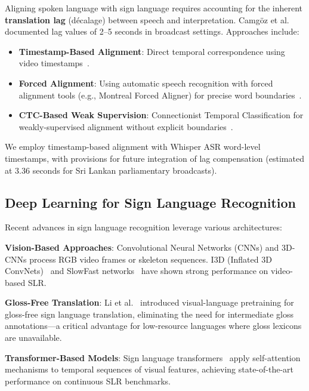 \documentclass[journal]{IEEEtran}
\begin{document}
Aligning spoken language with sign language requires accounting for the inherent \textbf{translation lag} (décalage) between speech and interpretation. Camgöz et al.~\cite{camgoz2018neural} documented lag values of 2--5 seconds in broadcast settings. Approaches include:

\begin{itemize}
    \item \textbf{Timestamp-Based Alignment}: Direct temporal correspondence using video timestamps~\cite{camgoz2018neural}.
    \item \textbf{Forced Alignment}: Using automatic speech recognition with forced alignment tools (e.g., Montreal Forced Aligner) for precise word boundaries~\cite{mcauliffe2017montreal}.
    \item \textbf{CTC-Based Weak Supervision}: Connectionist Temporal Classification for weakly-supervised alignment without explicit boundaries~\cite{graves2006connectionist}.
\end{itemize}

We employ timestamp-based alignment with Whisper ASR word-level timestamps, with provisions for future integration of lag compensation (estimated at 3.36 seconds for Sri Lankan parliamentary broadcasts).

\subsection{Deep Learning for Sign Language Recognition}

Recent advances in sign language recognition leverage various architectures:

\textbf{Vision-Based Approaches}: Convolutional Neural Networks (CNNs) and 3D-CNNs process RGB video frames or skeleton sequences. I3D (Inflated 3D ConvNets)~\cite{carreira2017quo} and SlowFast networks~\cite{feichtenhofer2019slowfast} have shown strong performance on video-based SLR.

\textbf{Gloss-Free Translation}: Li et al.~\cite{li2023gloss} introduced visual-language pretraining for gloss-free sign language translation, eliminating the need for intermediate gloss annotations---a critical advantage for low-resource languages where gloss lexicons are unavailable.

\textbf{Transformer-Based Models}: Sign language transformers~\cite{camgoz2020sign} apply self-attention mechanisms to temporal sequences of visual features, achieving state-of-the-art performance on continuous SLR benchmarks.
\end{document}

